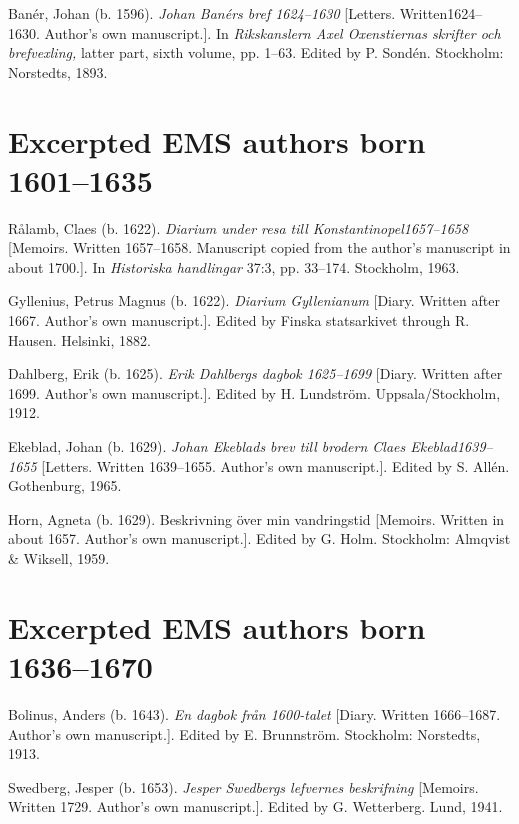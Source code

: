 \documentclass[output=paper]{langscibook}
\begin{document}
Banér, Johan (b. 1596). \textit{Johan Banérs bref 1624–1630} [Letters. Written1624–1630. Author’s own manuscript.]. In \textit{Rikskanslern Axel Oxenstiernas skrifter och brefvexling,} latter part, sixth volume, pp. 1–63. Edited by P. Sondén. Stockholm: Norstedts, 1893. 


\section*{Excerpted EMS authors born 1601–1635}


Rålamb, Claes (b. 1622). \textit{Diarium under resa till Konstantinopel1657–1658} [Memoirs. Written 1657–1658. Manuscript copied from the author’s manuscript in about 1700.]. In \textit{Historiska handlingar} 37:3, pp. 33–174. Stockholm, 1963.



Gyllenius, Petrus Magnus (b. 1622). \textit{Diarium Gyllenianum} [Diary. Written after 1667. Author’s own manuscript.]. Edited by Finska statsarkivet through R. Hausen. Helsinki, 1882.



Dahlberg, Erik (b. 1625). \textit{Erik Dahlbergs dagbok 1625–1699} [Diary. Written after 1699. Author’s own manuscript.]. Edited by H. Lundström. Uppsala/Stockholm, 1912.



Ekeblad, Johan (b. 1629). \textit{Johan Ekeblads brev till brodern Claes Ekeblad1639–1655} [Letters. Written 1639–1655. Author’s own manuscript.]. Edited by S. Allén. Gothenburg, 1965.



Horn, Agneta (b. 1629). Beskrivning över min vandringstid [Memoirs. Written in about 1657. Author’s own manuscript.]. Edited by G. Holm. Stockholm: Almqvist \& Wiksell, 1959.


\section*{Excerpted EMS authors born 1636–1670}


Bolinus, Anders (b. 1643). \textit{En dagbok från 1600-talet} [Diary. Written 1666–1687. Author’s own manuscript.]. Edited by E. Brunnström. Stockholm: Norstedts, 1913.



Swedberg, Jesper (b. 1653). \textit{Jesper Swedbergs lefvernes beskrifning} [Memoirs. Written 1729. Author’s own manuscript.]. Edited by G. Wetterberg. Lund, 1941.
\end{document}
